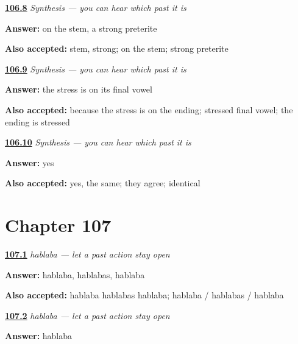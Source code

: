 \noindent\begin{minipage}[t]{\linewidth}
\raggedright
\hyperlink{review-ES-C15-sintesis-preterito-stress}{\textbf{106.8}} \emph{Synthesis — you can hear which past it is}\par
\small \textbf{Answer:} on the stem, a strong preterite\par
\footnotesize \textbf{Also accepted:} stem, strong; on the stem; strong preterite
\end{minipage}\par\medskip

\noindent\begin{minipage}[t]{\linewidth}
\raggedright
\hyperlink{review-ES-C15-sintesis-preterito-accent}{\textbf{106.9}} \emph{Synthesis — you can hear which past it is}\par
\small \textbf{Answer:} the stress is on its final vowel\par
\footnotesize \textbf{Also accepted:} because the stress is on the ending; stressed final vowel; the ending is stressed
\end{minipage}\par\medskip

\noindent\begin{minipage}[t]{\linewidth}
\raggedright
\hyperlink{review-ES-C15-sintesis-preterito-families}{\textbf{106.10}} \emph{Synthesis — you can hear which past it is}\par
\small \textbf{Answer:} yes\par
\footnotesize \textbf{Also accepted:} yes, the same; they agree; identical
\end{minipage}\par\medskip

\section*{Chapter 107}

\noindent\begin{minipage}[t]{\linewidth}
\raggedright
\hyperlink{review-ES-C16-imperfecto-singular-forms}{\textbf{107.1}} \emph{hablaba — let a past action stay open}\par
\small \textbf{Answer:} hablaba, hablabas, hablaba\par
\footnotesize \textbf{Also accepted:} hablaba hablabas hablaba; hablaba / hablabas / hablaba
\end{minipage}\par\medskip

\noindent\begin{minipage}[t]{\linewidth}
\raggedright
\hyperlink{review-ES-C16-imperfecto-hable-hablaba}{\textbf{107.2}} \emph{hablaba — let a past action stay open}\par
\small \textbf{Answer:} hablaba\par
\end{minipage}\par\medskip

